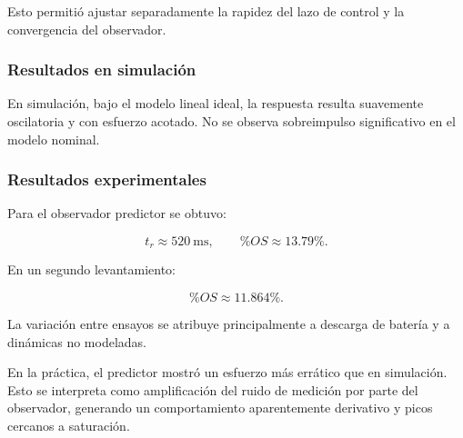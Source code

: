 Esto permitió ajustar separadamente la rapidez del lazo de control
y la convergencia del observador.

\subsubsection{Resultados en simulación}





En simulación, bajo el modelo lineal ideal, la respuesta resulta
suavemente oscilatoria y con esfuerzo acotado. No se observa
sobreimpulso significativo en el modelo nominal.

\subsubsection{Resultados experimentales}



Para el observador predictor se obtuvo:

\[
t_r \approx 520~\text{ms},
\qquad
\%OS \approx 13.79\%.
\]

En un segundo levantamiento:

\[
\%OS \approx 11.864\%.
\]

La variación entre ensayos se atribuye principalmente a descarga
de batería y a dinámicas no modeladas.

En la práctica, el predictor mostró un esfuerzo más errático que
en simulación. Esto se interpreta como amplificación del ruido de
medición por parte del observador, generando un comportamiento
aparentemente derivativo y picos cercanos a saturación.

